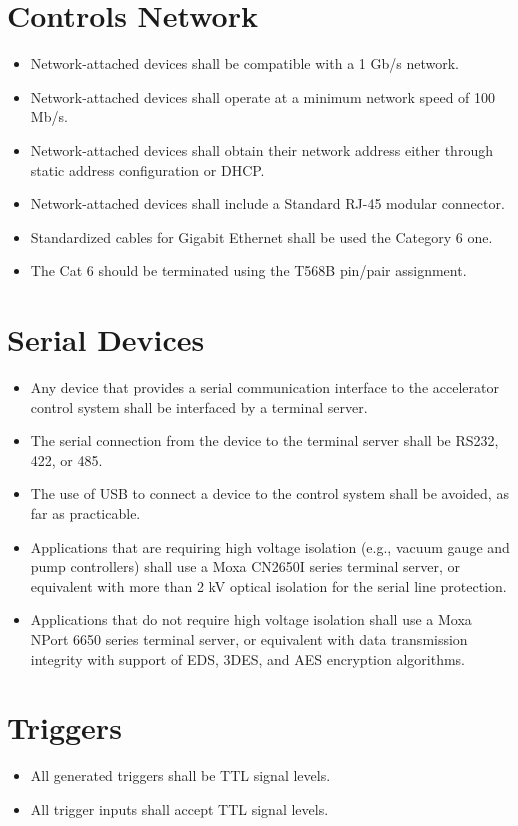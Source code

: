 \documentclass[11pt
  , a4paper
  , article
  , oneside
]{memoir}
\begin{document}
\section{Controls Network}
\begin{itemize}
  \item Network-attached devices shall be compatible with a 1 Gb/s network.
  \item Network-attached devices shall operate at a minimum network speed of 100 Mb/s.
  \item Network-attached devices shall obtain their network address either through static address configuration or DHCP.
  \item Network-attached devices shall include a Standard RJ-45 modular connector.
  \item Standardized cables for Gigabit Ethernet shall be used the Category 6 one.
  \item The Cat 6 should be terminated using the T568B pin/pair assignment.
\end{itemize}



\section{Serial Devices}
\begin{itemize}
  \item Any device that provides a serial communication interface to the accelerator control system shall be interfaced by a terminal server.
  \item The serial connection from the device to the terminal server shall be RS232, 422, or 485.
  \item The use of USB to connect a device to the control system shall be avoided, as far as practicable.
  \item Applications that are requiring high voltage isolation (e.g., vacuum gauge and pump controllers) shall use a Moxa CN2650I series terminal server, or equivalent with more than 2 kV optical isolation for the serial line protection.
  \item Applications that do not require high voltage isolation shall use a Moxa NPort 6650 series terminal server, or equivalent with data transmission integrity with support of EDS, 3DES, and AES encryption algorithms.
\end{itemize}

\section{Triggers}
\begin{itemize}
  \item All generated triggers shall be TTL signal levels.
  \item All trigger inputs shall accept TTL signal levels.
\end{itemize}
\end{document}
